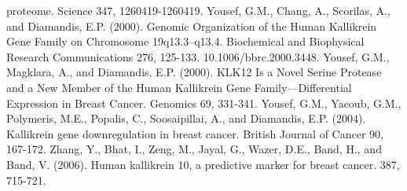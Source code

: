 \documentclass[
]{article}
\begin{document}
proteome. Science 347, 1260419-1260419. Yousef, G.M., Chang, A.,
Scorilas, A., and Diamandis, E.P. (2000). Genomic Organization of the
Human Kallikrein Gene Family on Chromosome 19q13.3--q13.4. Biochemical
and Biophysical Research Communications 276, 125-133.
10.1006/bbrc.2000.3448. Yousef, G.M., Magklara, A., and Diamandis, E.P.
(2000). KLK12 Is a Novel Serine Protease and a New Member of the Human
Kallikrein Gene Family---Differential Expression in Breast Cancer.
Genomics 69, 331-341. Yousef, G.M., Yacoub, G.M., Polymeris, M.E.,
Popalis, C., Soosaipillai, A., and Diamandis, E.P. (2004). Kallikrein
gene downregulation in breast cancer. British Journal of Cancer 90,
167-172. Zhang, Y., Bhat, I., Zeng, M., Jayal, G., Wazer, D.E., Band,
H., and Band, V. (2006). Human kallikrein 10, a predictive marker for
breast cancer. 387, 715-721.
\end{document}
